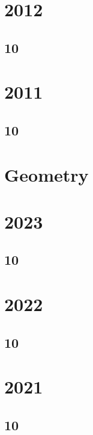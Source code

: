 \section{2012}
\subsection{10}


\section{2011}
\subsection{10}



%

\section{Geometry}
\section{2023}
\subsection{10}


\section{2022}
\subsection{10}


\section{2021}
\subsection{10}

